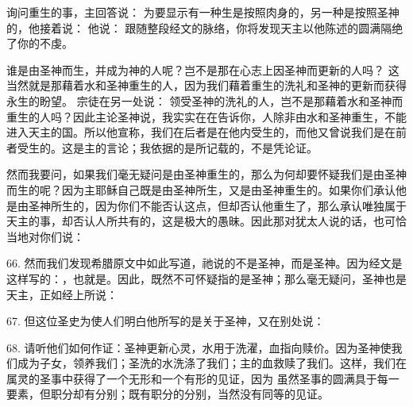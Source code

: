 询问重生的事，主回答说： 为要显示有一种生是按照肉身的，另一种是按照圣神的，他接着说： 他说： 跟随整段经文的脉络，你将发现天主以他陈述的圆满隔绝了你的不虔。\par

谁是由圣神而生，并成为神的人呢？岂不是那在心志上因圣神而更新的人吗？ 这当然就是那藉着水和圣神重生的人，因为我们藉着重生的洗礼和圣神的更新而获得永生的盼望。 宗徒在另一处说： 领受圣神的洗礼的人，岂不是那藉着水和圣神而重生的人吗？因此主论圣神说，我实实在在告诉你，人除非由水和圣神重生，不能进入天主的国。所以他宣称，我们在后者是在他内受生的，而他又曾说我们是在前者受生的。这是主的言论；我依据的是所记载的，不是凭论证。\par

然而我要问，如果我们毫无疑问是由圣神重生的，那么为何却要怀疑我们是由圣神而生的呢？因为主耶稣自己既是由圣神所生，又是由圣神重生的。如果你们承认他是由圣神所生的，因为你们不能否认这点，但却否认他重生了，那么承认唯独属于天主的事，却否认人所共有的，这是极大的愚昧。因此那对犹太人说的话，也可恰当地对你们说：\par

66. 然而我们发现希腊原文中如此写道，祂说的不是圣神，而是圣神。因为经文是这样写的：，也就是。因此，既然不可怀疑指的是圣神；那么毫无疑问，圣神也是天主，正如经上所说：\par

67. 但这位圣史为使人们明白他所写的是关于圣神，又在别处说：\par

68. 请听他们如何作证：圣神更新心灵，水用于洗濯，血指向赎价。因为圣神使我们成为子女，领养我们；圣洗的水洗涤了我们；主的血救赎了我们。这样，我们在属灵的圣事中获得了一个无形和一个有形的见证，因为  虽然圣事的圆满具于每一要素，但职分却有分别；既有职分的分别，当然没有同等的见证。\par

